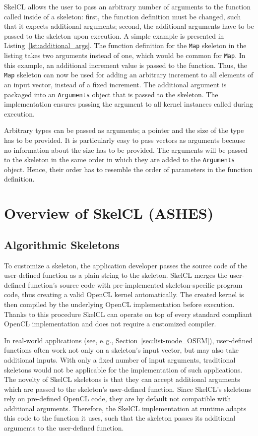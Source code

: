 SkelCL allows the user to pass an arbitrary number of arguments to the function called inside of a skeleton:
first, the function definition must be changed, such that it expects additional arguments;
second, the additional arguments have to be passed to the skeleton upon execution.
A simple example is presented in Listing~\ref{lst:additional_args}.
The function definition for the \texttt{Map} skeleton in the listing takes two arguments instead of one, which would be common for \texttt{Map}.
In this example, an additional increment value is passed to the function.
Thus, the \texttt{Map} skeleton can now be used for adding an arbitrary increment to all elements of an input vector, instead of a fixed increment.
The additional argument is packaged into an \texttt{Arguments} object that is passed to the skeleton.
The implementation ensures passing the argument to all kernel instances called during execution.

Arbitrary types can be passed as arguments; a pointer and the size of the type has to be provided.
It is particularly easy to pass vectors as arguments because no information about the size has to be provided.
The arguments will be passed to the skeleton in the same order in which they are added to the \texttt{Arguments} object.
Hence, their order has to resemble the order of parameters in the function definition.




\section{Overview of SkelCL (ASHES)} 
\subsection{Algorithmic Skeletons}

To customize a skeleton, the application developer passes the source code of the user-defined function as a plain string to the skeleton.
SkelCL merges the user-defined function's source code with pre-implemented skeleton-specific program code, thus creating a valid OpenCL kernel automatically.
The created kernel is then compiled by the underlying OpenCL implementation before execution.
Thanks to this procedure SkelCL can operate on top of every standard compliant OpenCL implementation and does not require a customized compiler.

In real-world applications (see, e.\,g., Section~\ref{sec:list-mode_OSEM}), user-defined functions often work not only on a skeleton's input vector, but may also take additional inputs.
With only a fixed number of input arguments, traditional skeletons would not be applicable for the implementation of such applications.
The novelty of SkelCL skeletons is that they can accept additional arguments which are passed to the skeleton's user-defined function.
Since SkelCL's skeletons rely on pre-defined OpenCL code, they are by default not compatible with additional arguments.
Therefore, the SkelCL implementation at runtime adapts this code to the function it uses, such that the skeleton passes its additional arguments to the user-defined function.

